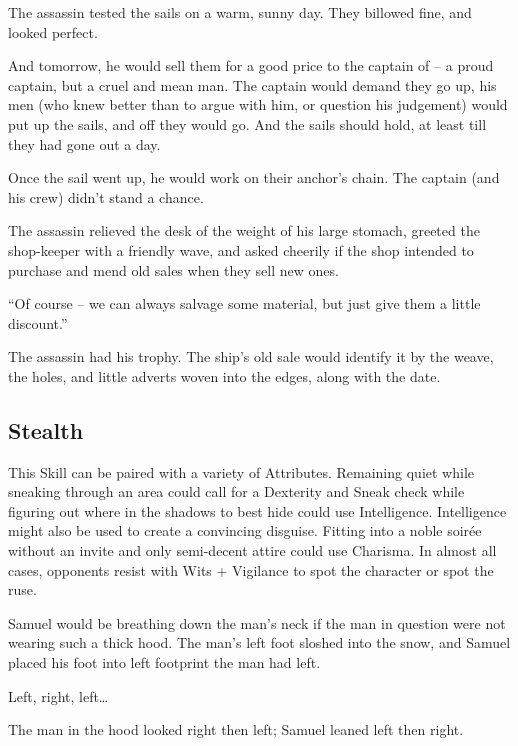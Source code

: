 \begin{multicols}{2}
\begin{exampletext}
  The assassin tested the sails on a warm, sunny day.
  They billowed fine, and looked perfect.

  And tomorrow, he would sell them for a good price to the captain of \iftoggle{aif}{\gls{king}'s Pride}{the Black Seal} -- a proud captain, but a cruel and mean man.
  The captain would demand they go up, his men (who knew better than to argue with him, or question his judgement) would put up the sails, and off they would go.
  And the sails should hold, at least till they had gone out a day.

  Once the sail went up, he would work on their anchor's chain.
  The captain (and his crew) didn't stand a chance.

  The assassin relieved the desk of the weight of his large stomach, greeted the shop-keeper with a friendly wave, and asked cheerily if the shop intended to purchase and mend old sales when they sell new ones.

  ``Of course -- we can always salvage some material, but just give them a little discount.''

  The assassin had his trophy.
  The ship's old sale would identify it by the weave, the holes, and little adverts woven into the edges, along with the date.

\end{exampletext}

\subsection{Stealth}

This Skill can be paired with a variety of Attributes.
Remaining quiet while sneaking through an area could call for a Dexterity and Sneak check while figuring out where in the shadows to best hide could use Intelligence.
Intelligence might also be used to create a convincing disguise.
Fitting into a noble soir\'{e}e without an invite and only semi-decent attire could use Charisma.
In almost all cases, opponents resist with Wits + Vigilance to spot the character or spot the ruse.

\begin{exampletext}
  Samuel would be breathing down the man's neck if the man in question were not wearing such a thick hood.
  The man's left foot sloshed into the snow, and Samuel placed his foot into left footprint the man had left.

  Left, right, left\ldots

  The man in the hood looked right then left; Samuel leaned left then right.


\end{exampletext}
\end{multicols}
